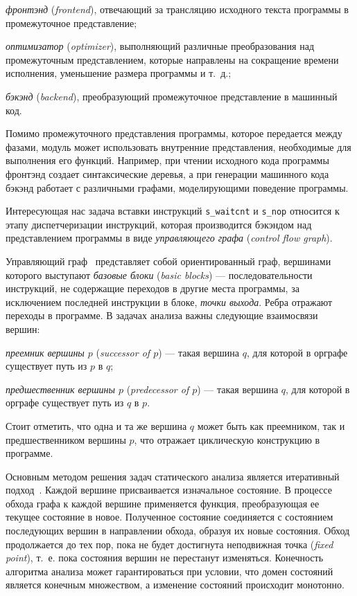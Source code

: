 \documentclass[a4paper,14pt]{extarticle}
\begin{document}
{\begin{ul}
\item \textit{фронтэнд} (\textit{frontend}), отвечающий за трансляцию исходного текста программы в
  промежуточное представление;
\item \textit{оптимизатор} (\textit{optimizer}), выполняющий различные преобразования над промежуточным
  представлением, которые направлены на сокращение времени исполнения,
  уменьшение размера программы и т.~д.;
\item \textit{бэкэнд} (\textit{backend}), преобразующий промежуточное представление в машинный код.
\end{ul}

Помимо промежуточного представления программы, которое передается между фазами,
модуль может использовать внутренние представления, необходимые для выполнения его функций.
Например, при чтении исходного кода программы фронтэнд создает синтаксические деревья,
а при генерации машинного кода бэкэнд работает с различными графами, моделирующими поведение
программы.

Интересующая нас задача вставки инструкций \verb|s_waitcnt| и \verb|s_nop| относится
к этапу диспетчеризации инструкций, которая производится бэкэндом над представлением программы
в виде \textit{управляющего графа} (\textit{control flow graph}).

Управляющий граф~\cite{cfg-allen, cfg-ru} представляет собой ориентированный граф, вершинами которого
выступают \textit{базовые блоки} (\textit{basic blocks}) — последовательности инструкций,
не содержащие переходов в другие места программы, за исключением последней
инструкции в блоке, \textit{точки выхода}. Ребра отражают переходы в программе.
В задачах анализа важны следующие взаимосвязи вершин:
\begin{ul}
\item \textit{преемник вершины $p$} (\textit{successor of $p$}) — такая вершина $q$,
  для которой в орграфе существует путь из $p$ в $q$;
\item \textit{предшественник вершины $p$} (\textit{predecessor of $p$}) — такая вершина $q$,
  для которой в орграфе существует путь из $q$ в $p$.
\end{ul}
Стоит отметить, что одна и та же вершина $q$ может быть как преемником, так и предшественником вершины $p$,
что отражает циклическую конструкцию в программе.

Основным методом решения задач статического анализа является итеративный подход~\cite[глава~8]{compilers}.
Каждой вершине присваивается изначальное состояние. В процессе обхода графа к каждой вершине
применяется функция, преобразующая ее текущее состояние в новое. Полученное состояние
соединяется с состоянием последующих вершин в направлении обхода, образуя их новые состояния.
Обход продолжается до тех пор, пока не будет достигнута неподвижная точка (\textit{fixed point}), т.~е.
пока состояния вершин не перестанут изменяться. Конечность алгоритма анализа может гарантироваться
при условии, что домен состояний является конечным множеством, а изменение состояний происходит монотонно.

}
\end{document}
